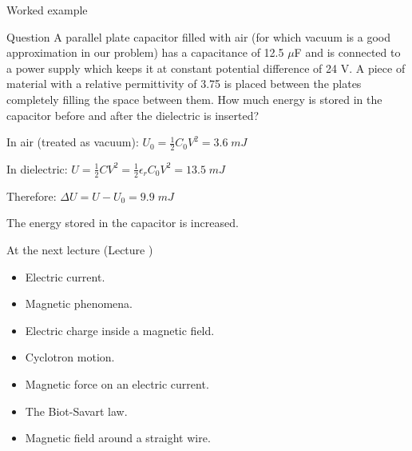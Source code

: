 %
%

{
\problemslide

\begin{frame}{Worked example}

\begin{blockexmplque}{Question}
A parallel plate capacitor filled with air (for which vacuum is a good approximation in our problem)
has a capacitance of 12.5 $\mu$F and is connected to a power supply which keeps it at constant
potential difference of 24 V. A piece of material with a relative permittivity of 3.75 is placed
between the plates completely filling the space between them.
How much energy is stored in the capacitor before and after the dielectric is inserted?
\end{blockexmplque}
\vspace{0.2cm}

In air (treated as vacuum): $\displaystyle U_0 = \frac{1}{2} C_0 V^2 = 3.6 \; mJ$\\
\vspace{0.2cm}

In dielectric: $\displaystyle U = \frac{1}{2} C V^2 = \frac{1}{2} \epsilon_r C_0 V^2 = 13.5 \; mJ$\\
\vspace{0.2cm}

Therefore: $\displaystyle  {\Delta}U = U - U_0 = 9.9 \; mJ$\\
\vspace{0.4cm}

The energy stored in the capacitor is increased.

\end{frame}

} %


%
%

\renewcommand{\lecturesummarytitle}{Main points to remember }


%
%

\begin{frame}{At the next lecture (Lecture \nextlecture)}

\begin{itemize}
\item Electric current.
\item Magnetic phenomena.
\item Electric charge inside a magnetic field.
\item Cyclotron motion.
\item Magnetic force on an electric current.
\item The Biot-Savart law.
\item Magnetic field around a straight wire.
\end{itemize}

\end{frame}

%
%



